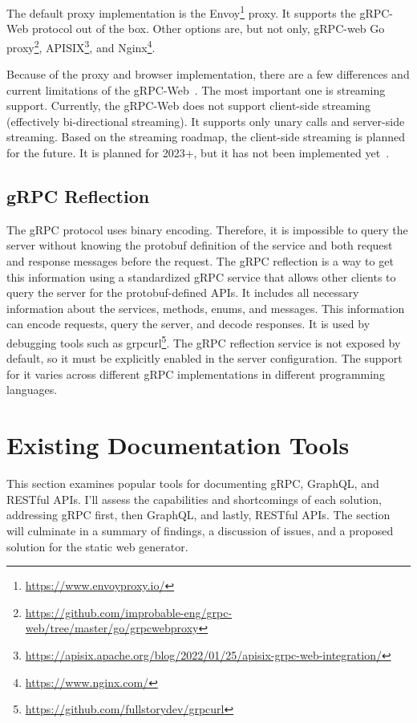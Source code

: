 The default proxy implementation is the Envoy\footnote{\url{https://www.envoyproxy.io/}} proxy.
It supports the gRPC-Web protocol out of the box.
Other options are, but not only, gRPC-web Go proxy\footnote{\url{https://github.com/improbable-eng/grpc-web/tree/master/go/grpcwebproxy}}, APISIX\footnote{\url{https://apisix.apache.org/blog/2022/01/25/apisix-grpc-web-integration/}}, and Nginx\footnote{\url{https://www.nginx.com/}}.

Because of the proxy and browser implementation, there are a few differences and current limitations of the gRPC-Web~\cite{grpc-web}.
The most important one is streaming support.
Currently, the gRPC-Web does not support client-side streaming (effectively bi-directional streaming).
It supports only unary calls and server-side streaming.
Based on the streaming roadmap, the client-side streaming is planned for the future.
It is planned for 2023+, but it has not been implemented yet~\cite{grpc-web-streaming-roadmap}.

\subsection{gRPC Reflection}
The gRPC protocol uses binary encoding.
Therefore, it is impossible to query the server without knowing the protobuf definition of the service and both request and response messages before the request.
The gRPC reflection is a way to get this information using a standardized gRPC service that allows other clients to query the server for the protobuf-defined APIs.
It includes all necessary information about the services, methods, enums, and messages.
This information can encode requests, query the server, and decode responses.
It is used by debugging tools such as grpcurl\footnote{\url{https://github.com/fullstorydev/grpcurl}}.
The gRPC reflection service is not exposed by default, so it must be explicitly enabled in the server configuration.
The support for it varies across different gRPC implementations in different programming languages.
\cite{grpc-reflection}


\section{Existing Documentation Tools}
This section examines popular tools for documenting gRPC, GraphQL, and RESTful APIs.
I'll assess the capabilities and shortcomings of each solution, addressing gRPC first, then GraphQL, and lastly, RESTful APIs.
The section will culminate in a summary of findings, a discussion of issues, and a proposed solution for the static web generator.

